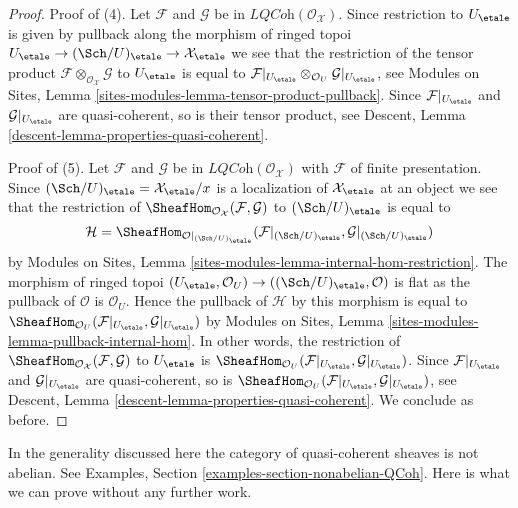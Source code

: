 \begin{proof}
\medskip\noindent
Proof of (4). Let $\mathcal{F}$ and $\mathcal{G}$ be in
$\textit{LQCoh}(\mathcal{O}_\mathcal{X})$. Since restriction to $U_\etale$
is given by pullback along the morphism of ringed topoi
$U_\etale \to (\Sch/U)_\etale \to \mathcal{X}_\etale$
we see that the restriction of the tensor product
$\mathcal{F} \otimes_{\mathcal{O}_\mathcal{X}} \mathcal{G}$
to $U_\etale$ is equal to
$\mathcal{F}|_{U_\etale} \otimes_{\mathcal{O}_U} \mathcal{G}|_{U_\etale}$,
see Modules on Sites, Lemma \ref{sites-modules-lemma-tensor-product-pullback}.
Since $\mathcal{F}|_{U_\etale}$ and $\mathcal{G}|_{U_\etale}$
are quasi-coherent, so is their tensor product, see
Descent, Lemma \ref{descent-lemma-properties-quasi-coherent}.

\medskip\noindent
Proof of (5). Let $\mathcal{F}$ and $\mathcal{G}$ be in
$\textit{LQCoh}(\mathcal{O}_\mathcal{X})$ with $\mathcal{F}$
of finite presentation. Since
$(\Sch/U)_\etale = \mathcal{X}_\etale/x$
is a localization of $\mathcal{X}_\etale$ at an object
we see that the restriction of
$\SheafHom_{\mathcal{O}_\mathcal{X}}(\mathcal{F}, \mathcal{G})$
to $(\Sch/U)_\etale$ is equal to
$$
\mathcal{H} =
\SheafHom_{\mathcal{O}|_{(\Sch/U)_\etale}}(
\mathcal{F}|_{(\Sch/U)_\etale}, \mathcal{G}|_{(\Sch/U)_\etale})
$$
by Modules on Sites, Lemma \ref{sites-modules-lemma-internal-hom-restriction}.
The morphism of ringed topoi
$(U_\etale, \mathcal{O}_U) \to ((\Sch/U)_\etale, \mathcal{O})$
is flat as the pullback of $\mathcal{O}$ is $\mathcal{O}_U$.
Hence the pullback of $\mathcal{H}$ by this morphism is equal to
$\SheafHom_{\mathcal{O}_U}(\mathcal{F}|_{U_\etale}, \mathcal{G}|_{U_\etale})$
by Modules on Sites, Lemma \ref{sites-modules-lemma-pullback-internal-hom}.
In other words, the restriction of
$\SheafHom_{\mathcal{O}_\mathcal{X}}(\mathcal{F}, \mathcal{G})$
to $U_\etale$ is
$\SheafHom_{\mathcal{O}_U}(\mathcal{F}|_{U_\etale}, \mathcal{G}|_{U_\etale})$.
Since $\mathcal{F}|_{U_\etale}$ and $\mathcal{G}|_{U_\etale}$
are quasi-coherent, so is
$\SheafHom_{\mathcal{O}_U}(\mathcal{F}|_{U_\etale}, \mathcal{G}|_{U_\etale})$,
see Descent, Lemma \ref{descent-lemma-properties-quasi-coherent}.
We conclude as before.
\end{proof}

\noindent
In the generality discussed here the category of quasi-coherent sheaves
is not abelian. See Examples, Section \ref{examples-section-nonabelian-QCoh}.
Here is what we can prove without any further work.

